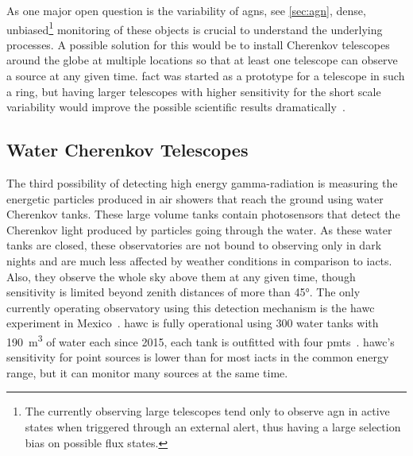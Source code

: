 As one major open question is the variability of \glspl{agn}, see \autoref{sec:agn},
dense, unbiased\footnote{The currently observing large telescopes tend only to observe
\gls{agn} in active states when triggered through an external alert, thus having a
large selection bias on possible flux states.} monitoring of these objects is crucial to understand the underlying processes.
A possible solution for this would be to install Cherenkov telescopes around the globe
at multiple locations so that at least one telescope can observe a source at
any given time.
\gls{fact} was started as a prototype for a telescope in such a ring, but 
having larger telescopes with higher sensitivity for the short scale variability
would improve the possible scientific results dramatically~\cite{ctr}.

\subsection{Water Cherenkov Telescopes}

The third possibility of detecting high energy gamma-radiation is
measuring the energetic particles produced in air showers that reach the ground
using water Cherenkov tanks.
These large volume tanks contain photosensors that detect the Cherenkov light
produced by particles going through the water.
As these water tanks are closed, these observatories are not bound to observing
only in dark nights and are much less affected by weather conditions in comparison
to \glspl{iact}.
Also, they observe the whole sky above them at any given time, though 
sensitivity is limited beyond zenith distances of more than \ang{45}.
The only currently operating observatory using this detection mechanism is
the \gls{hawc} experiment in Mexico~\cite{hawc-monitoring}.
\gls{hawc} is fully operational using 300 water tanks with \SI{190}{\cubic\meter}
of water each since 2015, each tank is outfitted with four \glspl{pmt}~\cite{hawc-monitoring}.
\gls{hawc}'s sensitivity for point sources is lower than for most \glspl{iact} in the
common energy range, but it can monitor many sources at the same time.


